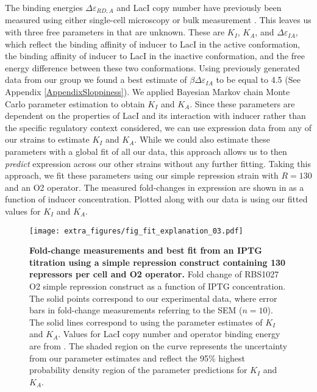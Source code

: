 The binding energies $\Delta \varepsilon_{RD,A}$ and LacI copy number have
previously been measured using either single-cell microscopy or bulk measurement \cite{Oehler1994,Vilar2003,Garcia2011, Brewster2014}. This leaves us with three free parameters in \eref[eq7] that are unknown. These are $K_I$, $K_A$, and $\Delta\varepsilon_{IA}$, which reflect the binding affinity of inducer to LacI in the active conformation, the binding affinity of inducer to LacI in the inactive conformation, and the free energy difference between these two conformations. Using previously generated data from our group we found a best estimate of $\beta\Delta\varepsilon_{IA}$ to be equal to 4.5 (See Appendix \ref{AppendixSloppiness}). We applied Bayesian Markov chain Monte Carlo parameter estimation to obtain $K_I$ and $K_A$. Since these parameters are dependent on the properties of LacI and its interaction with inducer rather than the specific regulatory context considered, we can use expression data from any of our strains to estimate $K_I$ and $K_A$. While we could also estimate these parameters with a global fit of all our data, this approach allows us to then \textit{predict} expression across our other strains without any further fitting. Taking this approach, we fit these parameters using our simple repression strain with $R=130$ and an O2 operator. The measured fold-changes in expression are shown in  as a function of inducer concentration. Plotted along with our data is \eref[eq7] using our fitted values for $K_I$ and $K_A$.

\begin{figure}[h]
	\centering \texttt{[image: extra\_figures/fig\_fit\_explanation\_03.pdf]}
	\caption{{\bf Fold-change measurements and best fit from an IPTG titration using a simple repression construct containing 130 repressors per cell and O2 operator.} Fold change of RBS1027 O2 simple repression construct as a function of IPTG concentration. The solid points correspond to our experimental data, where error bars in fold-change measurements referring to the SEM ($n=10$). The solid	lines correspond to \eref[eq7] using the parameter estimates of $K_I$ and $K_A$. Values for LacI copy number and operator binding energy are from \cite{Garcia2011}.  The shaded region on the curve represents the uncertainty from our parameter estimates and reflect the 95\% highest probability density region of the parameter predictions for $K_I$ and $K_A$. } \label{fig_result1}
\end{figure}

